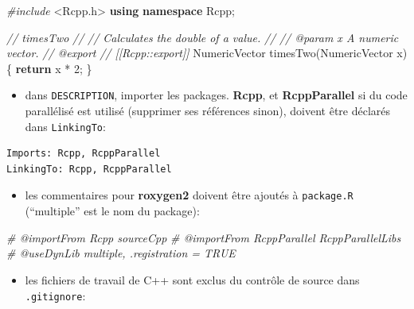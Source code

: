 \documentclass[
  11pt,
  french,
  a4paper,
  extrafontsizes,onecolumn,openright
  ]{memoir}
\newenvironment{Shaded}{\begin{snugshade}}{\end{snugshade}}
\newcommand{\CommentTok}[1]{\textcolor[rgb]{0.56,0.35,0.01}{\textit{#1}}}
\newcommand{\ControlFlowTok}[1]{\textcolor[rgb]{0.13,0.29,0.53}{\textbf{#1}}}
\newcommand{\DecValTok}[1]{\textcolor[rgb]{0.00,0.00,0.81}{#1}}
\newcommand{\ImportTok}[1]{#1}
\newcommand{\KeywordTok}[1]{\textcolor[rgb]{0.13,0.29,0.53}{\textbf{#1}}}
\newcommand{\NormalTok}[1]{#1}
\newcommand{\PreprocessorTok}[1]{\textcolor[rgb]{0.56,0.35,0.01}{\textit{#1}}}
\providecommand{\tightlist}{%
  \setlength{\itemsep}{0pt}\setlength{\parskip}{0pt}}
\begin{document}
\scriptsize

\begin{Shaded}
\begin{Highlighting}[]
\PreprocessorTok{\#include }\ImportTok{\textless{}Rcpp.h\textgreater{}}
\KeywordTok{using} \KeywordTok{namespace}\NormalTok{ Rcpp;}

\CommentTok{//\textquotesingle{} timesTwo}
\CommentTok{//\textquotesingle{}}
\CommentTok{//\textquotesingle{} Calculates the double of a value.}
\CommentTok{//\textquotesingle{}}
\CommentTok{//\textquotesingle{} @param x A numeric vector.}
\CommentTok{//\textquotesingle{} @export}
\CommentTok{// [[Rcpp::export]]}
\NormalTok{NumericVector timesTwo(NumericVector x) \{}
  \ControlFlowTok{return}\NormalTok{ x * }\DecValTok{2}\NormalTok{;}
\NormalTok{\}}
\end{Highlighting}
\end{Shaded}

\normalsize

\begin{itemize}
\tightlist
\item
  dans \texttt{DESCRIPTION}, importer les packages.
  \textbf{Rcpp}, et \textbf{RcppParallel} si du code parallélisé est utilisé (supprimer ses références sinon), doivent être déclarés dans \texttt{LinkingTo}:
\end{itemize}

\begin{verbatim}
Imports: Rcpp, RcppParallel
LinkingTo: Rcpp, RcppParallel
\end{verbatim}

\begin{itemize}
\tightlist
\item
  les commentaires pour \textbf{roxygen2} doivent être ajoutés à \texttt{package.R} (``multiple'' est le nom du package):
\end{itemize}

\scriptsize

\begin{Shaded}
\begin{Highlighting}[]
\CommentTok{\#\textquotesingle{} @importFrom Rcpp sourceCpp}
\CommentTok{\#\textquotesingle{} @importFrom RcppParallel RcppParallelLibs}
\CommentTok{\#\textquotesingle{} @useDynLib multiple, .registration = TRUE}
\end{Highlighting}
\end{Shaded}

\normalsize

\begin{itemize}
\tightlist
\item
  les fichiers de travail de C++ sont exclus du contrôle de source dans \texttt{.gitignore}:
\end{itemize}
\end{document}
